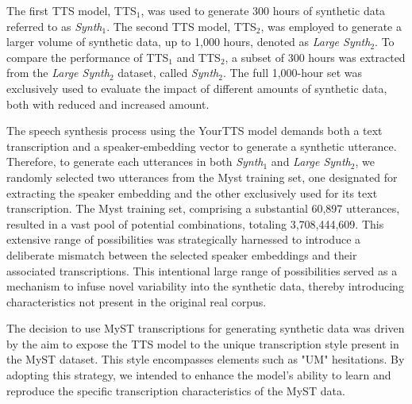 The first \ac{TTS} model, TTS$_1$, was used to generate 300 hours of synthetic data referred to as \textit{Synth$_1$}. The second \ac{TTS} model, TTS$_2$, was employed to generate a larger volume of synthetic data, up to 1,000 hours, denoted as \textit{Large Synth$_2 $}. To compare the performance of TTS$_1$ and TTS$_2$, a subset of 300 hours was extracted from the \textit{Large Synth$_2$} dataset, called \textit{Synth$_2$}. The full 1,000-hour set was exclusively used to evaluate the impact of different amounts of synthetic data, both with reduced and increased amount.

The speech synthesis process using the YourTTS model demands both a text transcription and a  speaker-embedding vector to generate a synthetic utterance. Therefore, to generate each utterances in both \textit{Synth$_1$} and \textit{Large Synth$_2$}, we randomly selected two utterances from the Myst training set, one designated for extracting the speaker embedding and the other exclusively used for its text transcription. The Myst training set, comprising a substantial 60,897 utterances, resulted in a vast pool of potential combinations, totaling 3,708,444,609. This extensive range of possibilities was strategically harnessed to introduce a deliberate mismatch between the selected speaker embeddings and their associated transcriptions. This intentional large range of possibilities served as a mechanism to infuse novel variability into the synthetic data, thereby introducing characteristics not present in the original real corpus.

The decision to use MyST transcriptions for generating synthetic data was driven by the aim to expose the \ac{TTS} model to the unique transcription style present in the MyST dataset. This style encompasses elements such as "UM" hesitations. By adopting this strategy, we intended to enhance the model's ability to learn and reproduce the specific transcription characteristics of the MyST data.

